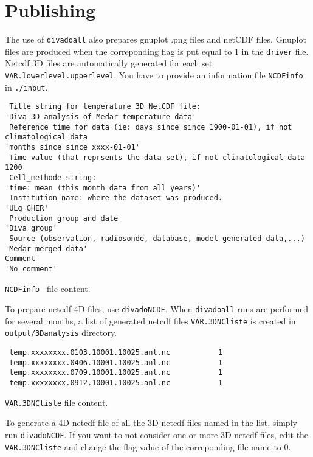 \documentclass[8pt,a4paper,notitlepage]{book}
\begin{document}
\section{Publishing}

The use of {\tt divadoall} also prepares gnuplot .png files and netCDF files.
Gnuplot files are produced when the correponding flag is put equal to 1 in the {\tt driver} file.
Netcdf 3D files are automatically generated for each set {\tt VAR.lowerlevel.upperlevel}. You have to provide an information file {\tt NCDFinfo} in {\tt ./input}.

\begin{exfile}[H]
\begin{footnotesize}
\begin{verbatim}
 Title string for temperature 3D NetCDF file:
'Diva 3D analysis of Medar temperature data'
 Reference time for data (ie: days since since 1900-01-01), if not climatological data
'months since since xxxx-01-01'
 Time value (that reprsents the data set), if not climatological data
1200
 Cell_methode string:
'time: mean (this month data from all years)'
 Institution name: where the dataset was produced.
'ULg_GHER'
 Production group and date
'Diva group'
 Source (observation, radiosonde, database, model-generated data,...)
'Medar merged data'
Comment
'No comment'
\end{verbatim}
\end{footnotesize}
\caption{{\tt NCDFinfo } file content.} 
\end{exfile}

To prepare netcdf 4D files, use {\tt divadoNCDF}. When {\tt divadoall} runs are performed for several months, a list of generated netcdf files {\tt VAR.3DNCliste} is created in {\tt output/3Danalysis} directory.

\begin{exfile}[H]
\begin{footnotesize}
\begin{verbatim}
 temp.xxxxxxxx.0103.10001.10025.anl.nc           1
 temp.xxxxxxxx.0406.10001.10025.anl.nc           1
 temp.xxxxxxxx.0709.10001.10025.anl.nc           1
 temp.xxxxxxxx.0912.10001.10025.anl.nc           1
\end{verbatim}
\end{footnotesize}
\caption{{\tt VAR.3DNCliste} file content.} 
\end{exfile}

 To generate a 4D netcdf file of all the 3D netcdf files named in the list, simply run {\tt divadoNCDF}. If you want to not consider one or more 3D netcdf files, edit the {\tt VAR.3DNCliste} and change the flag value of the correponding file name to 0.
\end{document}
